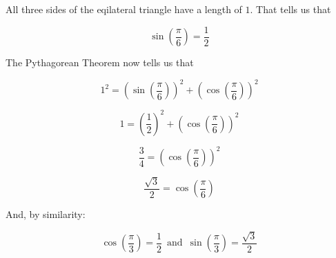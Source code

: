 \documentclass{ximera}
\begin{document}
All three sides of the eqilateral triangle have a length of $1$.  That tells us that 

\[  \sin\left( \frac{\pi}{6} \right) = \frac{1}{2} \]


The Pythagorean Theorem now tells us that 

\[  1^2 = \left( \sin\left( \frac{\pi}{6} \right) \right)^2 + \left( \cos\left( \frac{\pi}{6} \right) \right)^2  \]


\[  1 = \left( \frac{1}{2} \right)^2 + \left( \cos\left( \frac{\pi}{6} \right) \right)^2  \]


\[  \frac{3}{4} = \left( \cos\left( \frac{\pi}{6} \right) \right)^2  \]



\[  \frac{\sqrt{3}}{2} = \cos\left( \frac{\pi}{6} \right)   \]



And, by similarity:


\[  \cos\left( \frac{\pi}{3} \right) = \frac{1}{2}   \, \text{ and } \,   \sin\left( \frac{\pi}{3} \right)  = \frac{\sqrt{3}}{2} \]  
\end{document}
